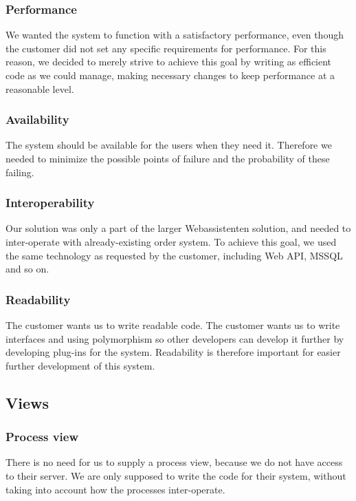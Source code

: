 \subsubsection{Performance}
We wanted the system to function with a satisfactory performance, even though the customer did not set any specific requirements for performance. For this reason, we decided to merely strive to achieve this goal by writing as efficient code as we could manage, making necessary changes to keep performance at a reasonable level. %

\subsubsection{Availability}
The system should be available for the users when they need it. Therefore we needed to minimize the possible points of failure and the probability of these failing. %

\subsubsection{Interoperability}
Our solution was only a part of the larger Webassistenten solution, and needed to inter-operate with already-existing order system. To achieve this goal, we used the same technology as requested by the customer, including Web API, MSSQL and so on.

\subsubsection{Readability}
The customer wants us to write readable code. The customer wants us to write interfaces and using polymorphism so other developers can develop it further by developing plug-ins for the system. Readability is therefore important for easier further development of this system.

\subsection{Views}


\subsubsection{Process view}
There is no need for us to supply a process view, because we do not have access to their server. We are only supposed to write the code for their system, without taking into account how the processes inter-operate.
